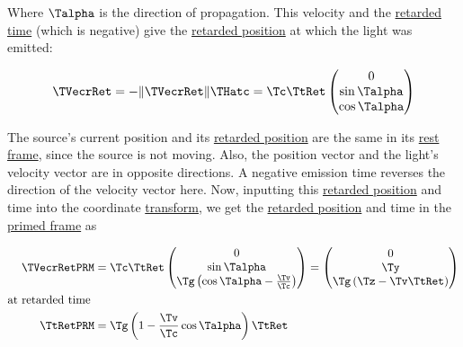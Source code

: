 Where ${\Talpha }$ is the direction of propagation.
This velocity and the \hyperlink{def-retarded-time}{retarded time} (which is negative) give the \hyperlink{def-retarded-position}{retarded position} at which the light was emitted:

\begin{equation}
	\TVecrRet  = -\|\TVecrRet \|\THatc  ={\Tc }{ { \TtRet  } }
	\begin{pmatrix}
		0            \\
		\sin{\Talpha } \\
		\cos{\Talpha } \\
	\end{pmatrix}
\end{equation}

The source's current position and its \hyperlink{def-retarded-position}{retarded position} are the same in its \hyperlink{def-proper-frame}{rest frame}, since the source is not moving.
Also, the position vector and the light's velocity vector are in opposite directions.
A negative emission time reverses the direction of the velocity vector here.
Now, inputting this \hyperlink{def-retarded-position}{retarded position} and time into the coordinate \hyperlink{def-transform}{transform}, we get the \hyperlink{def-retarded-position}{retarded position} and time in the \hyperlink{def-Primed-Frame}{primed frame} as

\begin{equation}
	\begin{aligned}
		\TVecrRetPRM      & = {\Tc }{ \TtRet  }
		\begin{pmatrix}
			0                                                \\
			\sin{\Talpha }                                     \\
			{\Tg } \left( \cos{\Talpha }-\frac{\Tv }{\Tc } \right) \\
		\end{pmatrix}
		=
		\begin{pmatrix}
			0                                             \\
			{\Ty }                                           \\
			{\Tg } \left( {\Tz }-{\Tv } { { \TtRet  } } \right) \\
		\end{pmatrix}
		\\
		\text{at retarded time } &
		\\ { \TtRetPRM  } & = \Tg  \left(1-\frac{\Tv }{\Tc } \cos{\Talpha } \right) { { \TtRet  } }
	\end{aligned}
\end{equation}

